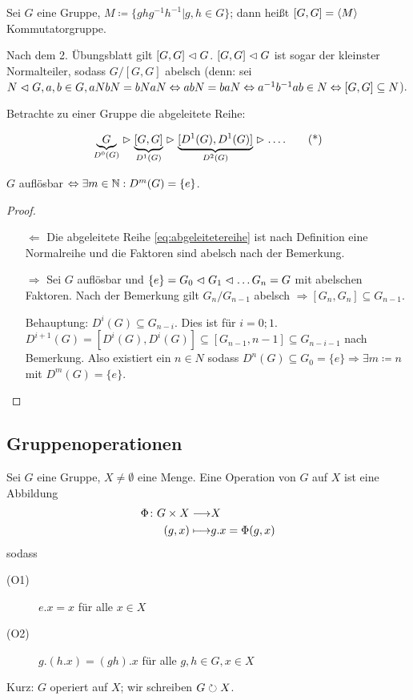 \documentclass[12pt,a4paper]{scrartcl}
\begin{document}
\begin{defi}
	Sei $G$ eine Gruppe, $M \coloneqq \{ghg^{-1}h^{-1}|g,h\in G\}$; dann heißt $[G,G] = \langle M\rangle$ Kommutatorgruppe.
\end{defi}

\begin{bem}
	Nach dem 2. Übungsblatt gilt $[G,G] \vartriangleleft G$. $[G,G]\vartriangleleft G$ ist sogar der kleinster Normalteiler, sodass $G/[G,G]$ abelsch (denn: sei $N\vartriangleleft G, a,b\in G, aNbN = bNaN\Leftrightarrow abN = baN\Leftrightarrow a^{-1}b^{-1}ab\in N\Leftrightarrow [G,G]\subseteq N$).
\end{bem}

\noindent
Betrachte zu einer Gruppe die abgeleitete Reihe:

\begin{equation}
\underbrace{G}_{D^0(G)} \vartriangleright \underbrace{[G,G]}_{D^1(G)} \vartriangleright \underbrace{[D^1(G),D^1(G)]}_{D^2(G)} \vartriangleright \ldots . \tag{*}\label{eq:abgeleitetereihe}
\end{equation}

\begin{satz}
	$G$ auflösbar $\Leftrightarrow \exists m\in\mathbb N : D^m(G) = \{e\}$.
\end{satz}
\begin{proof}
	\leavevmode
	\begin{itemize}
		\item [\glqq $\Leftarrow$\grqq] Die abgeleitete Reihe \eqref{eq:abgeleitetereihe} ist nach Definition eine Normalreihe und die Faktoren sind abelsch nach der Bemerkung.
		\item [\glqq $\Rightarrow$\grqq] Sei $G$ auflösbar und $\{e\} = G_0\vartriangleleft G_1\vartriangleleft\dots G_n = G$ mit abelschen Faktoren. Nach der Bemerkung gilt $G_n/G_{n-1}$ abelsch $\Rightarrow [G_n,G_n]\subseteq G_{n-1}$.
		
		Behauptung: $D^i(G) \subseteq G_{n-i}$. Dies ist für $i = 0;1$. $D^{i+1}(G) = [D^i(G), D^i(G)]\subseteq [G_{n-1},{n-1}]\subseteq G_{n-i-1}$ nach Bemerkung. Also existiert ein $n\in N$ sodass $D^n(G) \subseteq G_0 = \{e\}\Rightarrow \exists m \coloneqq n$ mit $D^m(G) =\{e\}$.
  \qedhere
	\end{itemize}
\end{proof}


\subsection{Gruppenoperationen}
\begin{defi}
	Sei $G$ eine Gruppe, $X\neq \emptyset$ eine Menge. Eine Operation von $G$ auf $X$ ist eine Abbildung
	\begin{align*}
		\Phi\colon G\times X \longrightarrow & X\\
		(g,x) \longmapsto & g.x = \Phi(g,x)
	\end{align*}
	sodass
	\begin{description}
		\item[(O1)] $e.x = x$ für alle $x\in X$
		\item[(O2)] $g.(h.x) = (gh).x$ für alle $g,h\in G, x\in X$
	\end{description}
	Kurz: $G$ operiert auf $X$; wir schreiben $G\circlearrowright X$.
\end{defi}
\end{document}
